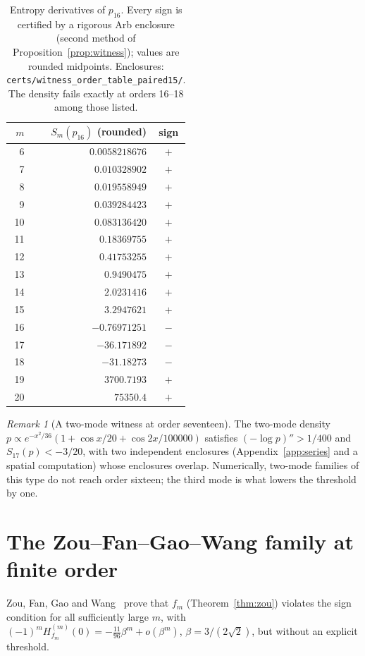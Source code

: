\documentclass[11pt]{article}
\theoremstyle{definition}
\theoremstyle{remark}
\newtheorem{remark}[theorem]{Remark}
\begin{document}
\begin{table}[htbp]
\centering
\begin{tabular}{rrc}
\toprule
$m$ & $S_m(p_{16})$ (rounded) & sign \\
\midrule
6 & $0.0058218676$ & $+$\\
7 & $0.010328902$ & $+$\\
8 & $0.019558949$ & $+$\\
9 & $0.039284423$ & $+$\\
10 & $0.083136420$ & $+$\\
11 & $0.18369755$ & $+$\\
12 & $0.41753255$ & $+$\\
13 & $0.9490475$ & $+$\\
14 & $2.0231416$ & $+$\\
15 & $3.2947621$ & $+$\\
16 & $-0.76971251$ & $-$\\
17 & $-36.171892$ & $-$\\
18 & $-31.18273$ & $-$\\
19 & $3700.7193$ & $+$\\
20 & $75350.4$ & $+$\\
\bottomrule
\end{tabular}
\caption{Entropy derivatives of $p_{16}$. Every sign is certified by a rigorous Arb
enclosure (second method of Proposition~\ref{prop:witness}); values are rounded
midpoints. Enclosures: \texttt{certs/witness\_order\_table\_paired15/}. The density
fails exactly at orders 16--18 among those listed.}
\label{tab:witness}
\end{table}

\begin{remark}[A two-mode witness at order seventeen]
The two-mode density $p\propto e^{-x^2/36}(1+\cos x/20+\cos2x/100000)$ satisfies
$(-\log p)''>1/400$ and $S_{17}(p)<-3/20$, with two independent enclosures
(Appendix~\ref{app:series} and a spatial computation) whose enclosures overlap.
Numerically, two-mode families of this type do not reach order sixteen; the third
mode is what lowers the threshold by one.
\end{remark}

\section{The Zou--Fan--Gao--Wang family at finite order}\label{sec:zou}
Zou, Fan, Gao and Wang~\cite{ZFGW26} prove that $f_m$ (Theorem~\ref{thm:zou})
violates the sign condition for all sufficiently large $m$, with
$(-1)^mH^{(m)}_{f_m}(0)=-\tfrac{11}{96}\beta^m+o(\beta^m)$, $\beta=3/(2\sqrt2)$, but
without an explicit threshold.
\end{document}

